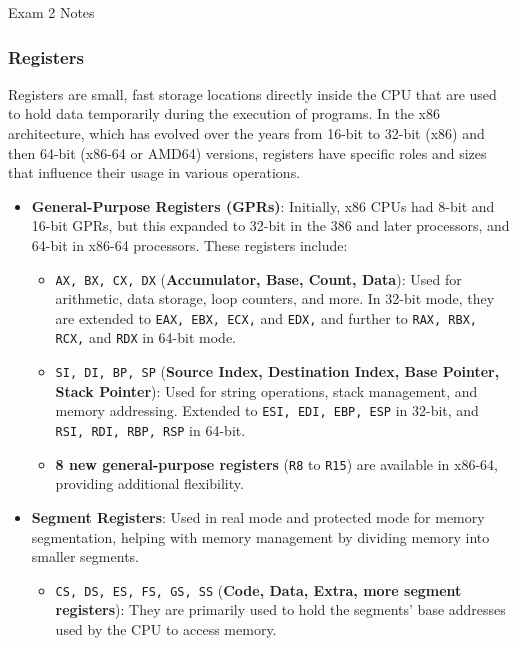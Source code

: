 \begin{examnotes}{Exam 2 Notes}
    \subsubsection*{Registers}

    Registers are small, fast storage locations directly inside the CPU that are used to hold data temporarily during the execution of programs. In the x86 architecture, which has evolved over the 
    years from 16-bit to 32-bit (x86) and then 64-bit (x86-64 or AMD64) versions, registers have specific roles and sizes that influence their usage in various operations.

    \begin{itemize}
        \item \textbf{General-Purpose Registers (GPRs)}: Initially, x86 CPUs had 8-bit and 16-bit GPRs, but this expanded to 32-bit in the 386 and later processors, and 64-bit in x86-64 processors. 
        These registers include:
        \begin{itemize}
            \item \texttt{AX, BX, CX, DX} (\textbf{Accumulator, Base, Count, Data}): Used for arithmetic, data storage, loop counters, and more. In 32-bit mode, they are extended to \texttt{EAX, EBX, ECX,} 
            and \texttt{EDX,} and further to \texttt{RAX, RBX, RCX,} and \texttt{RDX} in 64-bit mode.
            \item \texttt{SI, DI, BP, SP} (\textbf{Source Index, Destination Index, Base Pointer, Stack Pointer}): Used for string operations, stack management, and memory addressing. Extended to 
            \texttt{ESI, EDI, EBP, ESP} in 32-bit, and \texttt{RSI, RDI, RBP, RSP} in 64-bit.
            \item \textbf{8 new general-purpose registers} (\texttt{R8} to \texttt{R15}) are available in x86-64, providing additional flexibility.
        \end{itemize}
        \item \textbf{Segment Registers}: Used in real mode and protected mode for memory segmentation, helping with memory management by dividing memory into smaller segments.
        \begin{itemize}
            \item \texttt{CS, DS, ES, FS, GS, SS} (\textbf{Code, Data, Extra, more segment registers}): They are primarily used to hold the segments' base addresses used by the CPU to access memory.
        \end{itemize}

\end{itemize}
\end{examnotes}
